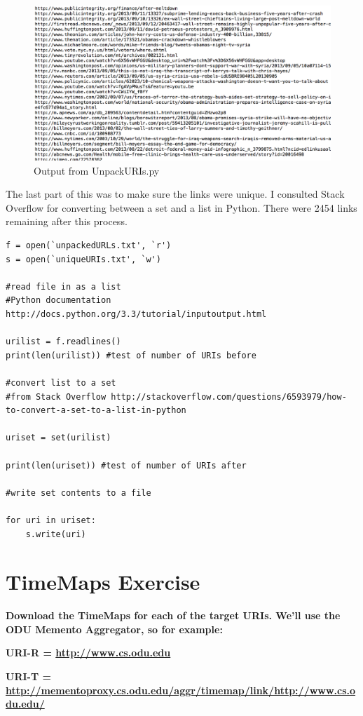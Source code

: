 \documentclass{article}
\begin{document}
\begin{figure}[H]
\centering
\includegraphics[scale=0.25]{q1/unshortened}
\caption{Output from UnpackURIs.py}
\label{unshorturls}
\end{figure}

The last part of this was to make sure the links were unique. I consulted Stack Overflow for converting between a set and a list in Python. There were 2454 links remaining after this process.

\begin{lstlisting}
f = open(`unpackedURLs.txt', `r')
s = open(`uniqueURIs.txt', `w')

#read file in as a list
#Python documentation http://docs.python.org/3.3/tutorial/inputoutput.html

urilist = f.readlines()
print(len(urilist)) #test of number of URIs before

#convert list to a set
#from Stack Overflow http://stackoverflow.com/questions/6593979/how-to-convert-a-set-to-a-list-in-python

uriset = set(urilist)

print(len(uriset)) #test of number of URIs after

#write set contents to a file

for uri in uriset:
    s.write(uri)
\end{lstlisting}

\newpage

\section{TimeMaps Exercise}
\textbf{Download the TimeMaps for each of the target URIs. We'll use the ODU Memento Aggregator, so for example:}

\textbf{URI-R = \url{http://www.cs.odu.edu}}

\textbf{URI-T = \url{http://mementoproxy.cs.odu.edu/aggr/timemap/link/http://www.cs.odu.edu/}}
\end{document}
